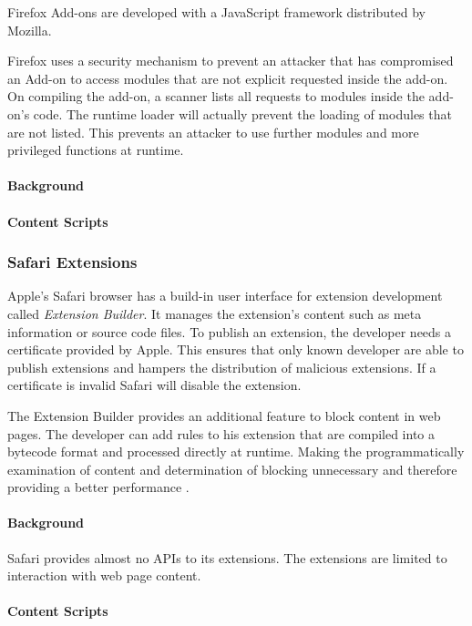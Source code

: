	Firefox Add-ons are developed with a JavaScript framework distributed by Mozilla. 


	
	Firefox uses a security mechanism to prevent an attacker that has compromised an Add-on to access modules that are not explicit requested inside the add-on. On compiling the add-on, a scanner lists all requests to modules inside the add-on's code. The runtime loader will actually prevent the loading of modules that are not listed. This prevents an attacker to use further modules and more privileged functions at runtime.
	
\paragraph{Background}

	

\paragraph{Content Scripts}


\subsubsection{Safari Extensions}

	Apple's Safari browser has a build-in user interface for extension development called \textit{Extension Builder}. It manages the extension's content such as meta information or source code files. To publish an extension, the developer needs a certificate provided by Apple. This ensures that only known developer are able to publish extensions and hampers the distribution of malicious extensions. If a certificate is invalid Safari will disable the extension.
	
	The Extension Builder provides an additional feature to block content in web pages. The developer can add rules to his extension that are compiled into a bytecode format and processed directly at runtime. Making the programmatically examination of content and determination of blocking unnecessary and therefore providing a better performance \cite{safariContentBlockingRules}.  

\paragraph{Background}

	Safari provides almost no APIs to its extensions. The extensions are limited to interaction with web page content.
	
\paragraph{Content Scripts}
